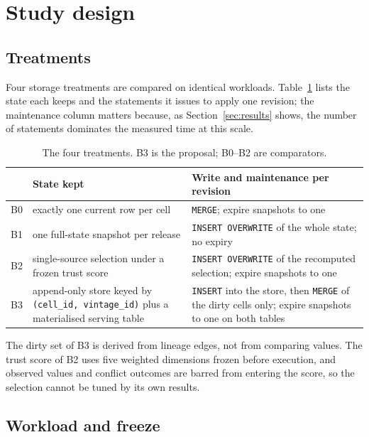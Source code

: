 \documentclass[a4paper,fleqn]{cas-dc}
\begin{document}
\section{Study design}\label{sec:design}

\subsection{Treatments}

Four storage treatments are compared on identical workloads. Table~\ref{tbl:trt}
lists the state each keeps and the statements it issues to apply one revision;
the maintenance column matters because, as Section~\ref{sec:results} shows, the
number of statements dominates the measured time at this scale.

\begin{table}[t]
\caption{The four treatments. B3 is the proposal; B0--B2 are comparators.}\label{tbl:trt}
\begin{tabular*}{\tblwidth}{@{}p{}p{}p{}@{}}
\toprule
 & State kept & Write and maintenance per revision \\
\midrule
B0 & exactly one current row per cell & \texttt{MERGE}; expire snapshots to one \\
B1 & one full-state snapshot per release & \texttt{INSERT OVERWRITE} of the whole state; no expiry \\
B2 & single-source selection under a frozen trust score & \texttt{INSERT OVERWRITE} of the recomputed selection; expire snapshots to one \\
B3 & append-only store keyed by \texttt{(cell\_id, vintage\_id)} plus a materialised serving table & \texttt{INSERT} into the store, then \texttt{MERGE} of the dirty cells only; expire snapshots to one on both tables \\
\bottomrule
\end{tabular*}
\end{table}

The dirty set of B3 is derived from lineage edges, not from comparing values.
The trust score of B2 uses five weighted dimensions frozen before execution, and
observed values and conflict outcomes are barred from entering the score, so the
selection cannot be tuned by its own results.

\subsection{Workload and freeze}
\end{document}
